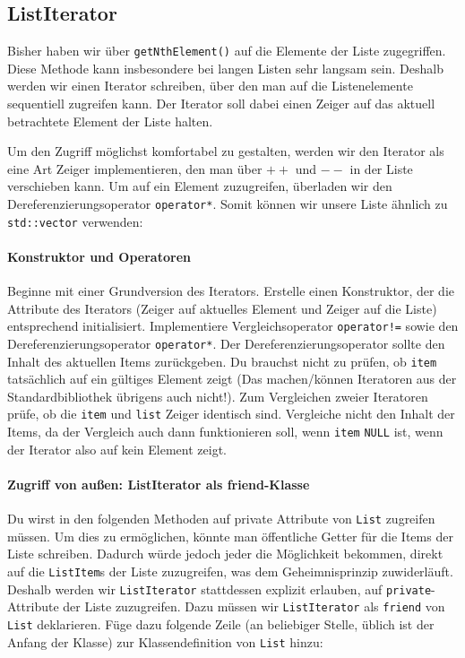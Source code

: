 \subsection{ListIterator}
Bisher haben wir über \lstinline{getNthElement()} auf die Elemente der Liste zugegriffen.
Diese Methode kann insbesondere bei langen Listen sehr langsam sein.
Deshalb werden wir einen Iterator schreiben, über den man auf die Listenelemente sequentiell zugreifen kann.
Der Iterator soll dabei einen Zeiger auf das aktuell betrachtete Element der Liste halten.

Um den Zugriff möglichst komfortabel zu gestalten, werden wir den Iterator als eine Art Zeiger implementieren, den man über \textbf{$++$} und \textbf{$--$} in der Liste verschieben kann.
Um auf ein Element zuzugreifen, überladen wir den Dereferenzierungsoperator \lstinline{operator*}.
Somit können wir unsere Liste ähnlich zu \lstinline{std::vector} verwenden:



\paragraph{Konstruktor und Operatoren} 
Beginne mit einer Grundversion des Iterators.
Erstelle einen Konstruktor, der die Attribute des Iterators (Zeiger auf aktuelles Element und Zeiger auf die Liste) entsprechend initialisiert.
Implementiere Vergleichsoperator \lstinline{operator!=} sowie den Dereferenzierungsoperator \lstinline{operator*}.
Der Dereferenzierungsoperator sollte den Inhalt des aktuellen Items zurückgeben.
Du brauchst nicht zu prüfen, ob \lstinline{item} tatsächlich auf ein gültiges Element zeigt (Das machen/können Iteratoren aus der Standardbibliothek übrigens auch nicht!).
Zum Vergleichen zweier Iteratoren prüfe, ob die \lstinline{item} und \lstinline{list} Zeiger identisch sind.
Vergleiche nicht den Inhalt der Items, da der Vergleich auch dann funktionieren soll, wenn \lstinline{item} \lstinline{NULL} ist, wenn der Iterator also auf kein Element zeigt.



\paragraph{Zugriff von außen: ListIterator als friend-Klasse} Du wirst in den folgenden Methoden auf private Attribute von \lstinline{List} zugreifen müssen.
Um dies zu ermöglichen, könnte man öffentliche Getter für die Items der Liste schreiben.
Dadurch würde jedoch jeder die Möglichkeit bekommen, direkt auf die \lstinline{ListItem}s der Liste zuzugreifen, was dem Geheimnisprinzip zuwiderläuft.
Deshalb werden wir \lstinline{ListIterator} stattdessen explizit erlauben, auf \lstinline{private}-Attribute der Liste zuzugreifen.
Dazu müssen wir \lstinline{ListIterator} als \lstinline{friend} von \lstinline{List} deklarieren.
Füge dazu folgende Zeile (an beliebiger Stelle, üblich ist der Anfang der Klasse) zur Klassendefinition von \lstinline{List} hinzu:

